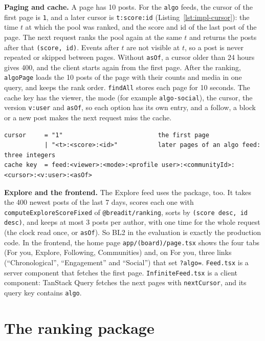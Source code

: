 \textbf{Paging and cache.} A page has 10 posts. For the \texttt{algo} feeds, the cursor of the first page is \texttt{1}, and a later cursor is \texttt{t:score:id} (Listing~\ref{lst:impl-cursor}): the time $t$ at which the pool was ranked, and the score and id of the last post of the page. The next request ranks the pool again at the same $t$ and returns the posts after that \texttt{(score, id)}. Events after $t$ are not visible at $t$, so a post is never repeated or skipped between pages. Without \texttt{asOf}, a cursor older than 24 hours gives 400, and the client starts again from the first page. After the ranking, \texttt{algoPage} loads the 10 posts of the page with their counts and media in one query, and keeps the rank order. \texttt{findAll} stores each page for 10 seconds. The cache key has the viewer, the mode (for example \texttt{algo-social}), the cursor, the version \texttt{v:user} and \texttt{asOf}, so each option has its own entry, and a follow, a block or a new post makes the next request miss the cache.

\begin{lstlisting}[caption={The cursor of an \texttt{algo} feed and the cache key of a feed page.}, label=lst:impl-cursor]
cursor     = "1"                          the first page
           | "<t>:<score>:<id>"           later pages of an algo feed: three integers
cache key  = feed:<viewer>:<mode>:<profile user>:<communityId>:<cursor>:<v:user>:<asOf>
\end{lstlisting}

\textbf{Explore and the frontend.} The Explore feed uses the package, too. It takes the 400 newest posts of the last 7 days, scores each one with \texttt{compute\allowbreak Explore\allowbreak ScoreFixed} of \texttt{@breadit/ranking}, sorts by \texttt{(score desc, id desc)}, and keeps at most 3 posts per author, with one time for the whole request (the clock read once, or \texttt{asOf}). So BL2 in the evaluation is exactly the production code. In the frontend, the home page \texttt{app/(board)/page.tsx} shows the four tabs (For you, Explore, Following, Communities) and, on For you, three links (``Chronological'', ``Engagement'' and ``Social'') that set \texttt{?algo=}. \texttt{Feed.tsx} is a server component that fetches the first page. \texttt{InfiniteFeed.tsx} is a client component: TanStack Query fetches the next pages with \texttt{nextCursor}, and its query key contains \texttt{algo}.

\section{The ranking package}
\label{sec:impl-ranking}

